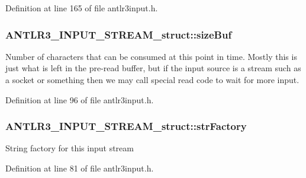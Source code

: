 Definition at line 165 of file antlr3input.\-h.

\hypertarget{struct_a_n_t_l_r3___i_n_p_u_t___s_t_r_e_a_m__struct_ae3b592e8fc40f7576b8ffd2125e26bb3}{
\subsubsection[{size\-Buf}]{ A\-N\-T\-L\-R3\-\_\-\-I\-N\-P\-U\-T\-\_\-\-S\-T\-R\-E\-A\-M\-\_\-struct\-::size\-Buf}}\label{struct_a_n_t_l_r3___i_n_p_u_t___s_t_r_e_a_m__struct_ae3b592e8fc40f7576b8ffd2125e26bb3}
Number of characters that can be consumed at this point in time. Mostly this is just what is left in the pre-\/read buffer, but if the input source is a stream such as a socket or something then we may call special read code to wait for more input. 

Definition at line 96 of file antlr3input.\-h.

\hypertarget{struct_a_n_t_l_r3___i_n_p_u_t___s_t_r_e_a_m__struct_ad3de400db5b8a382e5f1973ac5db70c0}{
\subsubsection[{str\-Factory}]{ A\-N\-T\-L\-R3\-\_\-\-I\-N\-P\-U\-T\-\_\-\-S\-T\-R\-E\-A\-M\-\_\-struct\-::str\-Factory}}\label{struct_a_n_t_l_r3___i_n_p_u_t___s_t_r_e_a_m__struct_ad3de400db5b8a382e5f1973ac5db70c0}
String factory for this input stream 

Definition at line 81 of file antlr3input.\-h.

